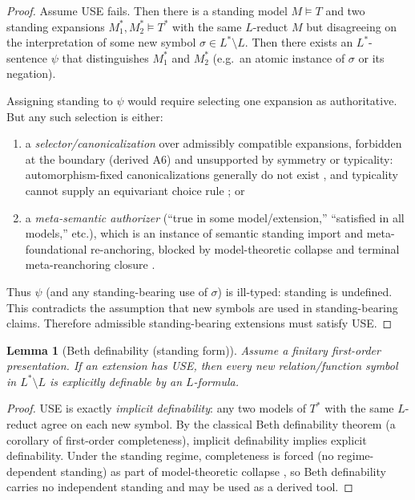 \documentclass[11pt]{article}
\newtheorem{lemma}[theorem]{Lemma}
\theoremstyle{definition}
\begin{document}
\begin{proof}
Assume USE fails.
Then there is a standing model $M\models T$ and two standing expansions $M_1^*,M_2^*\models T^*$ with the same $L$-reduct $M$
but disagreeing on the interpretation of some new symbol $\sigma\in L^*\setminus L$.
Then there exists an $L^*$-sentence $\psi$ that distinguishes $M_1^*$ and $M_2^*$ (e.g.\ an atomic instance of $\sigma$ or its negation).

Assigning standing to $\psi$ would require selecting one expansion as authoritative.
But any such selection is either:
\begin{enumerate}[label=\textbf{(i)}, leftmargin=2.4em]
\item a \emph{selector/canonicalization} over admissibly compatible expansions, forbidden at the boundary (derived A6) and
unsupported by symmetry or typicality: automorphism-fixed canonicalizations generally do not exist \cite{MaleyAutFixedLinearExtension2026}, and
typicality cannot supply an equivariant choice rule \cite{MaleyTypicalityCollapse2026}; or
\item a \emph{meta-semantic authorizer} (``true in some model/extension,'' ``satisfied in all models,'' etc.), which is an instance of
semantic standing import and meta-foundational re-anchoring, blocked by model-theoretic collapse \cite{MaleyModelTheoreticCollapse2026}
and terminal meta-reanchoring closure \cite{MaleyMetaReAnchorTerminal2026}.
\end{enumerate}
Thus $\psi$ (and any standing-bearing use of $\sigma$) is ill-typed: standing is undefined.
This contradicts the assumption that new symbols are used in standing-bearing claims.
Therefore admissible standing-bearing extensions must satisfy USE.
\end{proof}

\begin{lemma}[Beth definability (standing form)]
\label{lem:beth-standing}
Assume a finitary first-order presentation.
If an extension has USE, then every new relation/function symbol in $L^*\setminus L$ is explicitly definable by an $L$-formula.
\end{lemma}

\begin{proof}
USE is exactly \emph{implicit definability}: any two models of $T^*$ with the same $L$-reduct agree on each new symbol.
By the classical Beth definability theorem (a corollary of first-order completeness), implicit definability implies explicit definability.
Under the standing regime, completeness is forced (no regime-dependent standing) as part of model-theoretic collapse \cite{MaleyModelTheoreticCollapse2026},
so Beth definability carries no independent standing and may be used as a derived tool.
\end{proof}
\end{document}
